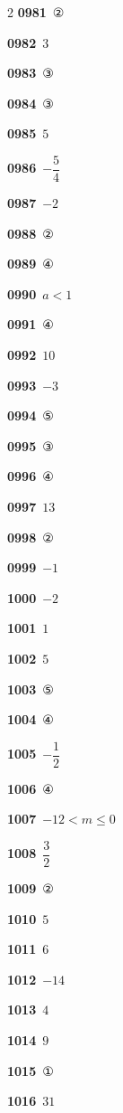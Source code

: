 \documentclass[10pt,a4paper]{article}
\begin{document}
\begin{multicols}{2}
\noindent\textbf{0981}\ ②\par
\noindent\textbf{0982}\ $3$\par
\noindent\textbf{0983}\ ③\par
\noindent\textbf{0984}\ ③\par
\noindent\textbf{0985}\ $5$\par
\noindent\textbf{0986}\ $-\dfrac{5}{4}$\par
\noindent\textbf{0987}\ $-2$\par
\noindent\textbf{0988}\ ②\par
\noindent\textbf{0989}\ ④\par
\noindent\textbf{0990}\ $a<1$\par
\noindent\textbf{0991}\ ④\par
\noindent\textbf{0992}\ $10$\par
\noindent\textbf{0993}\ $-3$\par
\noindent\textbf{0994}\ ⑤\par
\noindent\textbf{0995}\ ③\par
\noindent\textbf{0996}\ ④\par
\noindent\textbf{0997}\ $13$\par
\noindent\textbf{0998}\ ②\par
\noindent\textbf{0999}\ $-1$\par
\noindent\textbf{1000}\ $-2$\par
\noindent\textbf{1001}\ $1$\par
\noindent\textbf{1002}\ $5$\par
\noindent\textbf{1003}\ ⑤\par
\noindent\textbf{1004}\ ④\par
\noindent\textbf{1005}\ $-\dfrac{1}{2}$\par
\noindent\textbf{1006}\ ④\par
\noindent\textbf{1007}\ $-12<m\le 0$\par
\noindent\textbf{1008}\ $\dfrac{3}{2}$\par
\noindent\textbf{1009}\ ②\par
\noindent\textbf{1010}\ $5$\par
\noindent\textbf{1011}\ $6$\par
\noindent\textbf{1012}\ $-14$\par
\noindent\textbf{1013}\ $4$\par
\noindent\textbf{1014}\ $9$\par
\noindent\textbf{1015}\ ①\par
\noindent\textbf{1016}\ $31$\par

\end{multicols}
\end{document}
